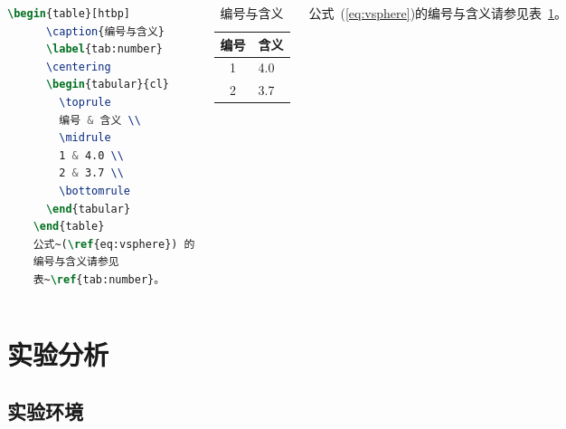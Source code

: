\documentclass{beamer}
\begin{document}
\begin{frame}[fragile]
    \begin{columns}
        \begin{lstlisting}[language=TeX]
    \begin{table}[htbp]
      \caption{编号与含义}
      \label{tab:number}
      \centering
      \begin{tabular}{cl}
        \toprule
        编号 & 含义 \\
        \midrule
        1 & 4.0 \\
        2 & 3.7 \\
        \bottomrule
      \end{tabular}
    \end{table}
    公式~(\ref{eq:vsphere}) 的
    编号与含义请参见
    表~\ref{tab:number}。
\end{lstlisting}
        \begin{table}[htpb]
            \centering
            \caption{编号与含义}
            \label{tab:number}
            \begin{tabular}{cl}\toprule
                编号 & 含义 \\\midrule
                1    & 4.0  \\
                2    & 3.7  \\\bottomrule
            \end{tabular}
        \end{table}
        \normalsize 公式~(\ref{eq:vsphere})的编号与含义请参见表~\ref{tab:number}。
    \end{columns}
\end{frame}



\section{实验分析}

\subsection{实验环境}
\end{document}
